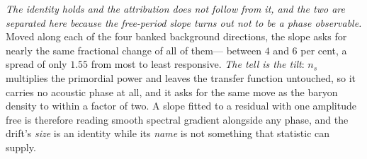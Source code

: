 \documentclass[11pt,a4paper]{article}
\theoremstyle{plain}
\theoremstyle{definition}
\theoremstyle{remark}
\begin{document}
\emph{The identity holds and the attribution does not follow from it, and the two are separated here
because the free-period slope turns out not to be a phase observable.} Moved along each of the four
banked background directions, the slope asks for nearly the same fractional change of all of them---
between $4$ and $6$ per cent, a spread of only $1.55$ from most to least responsive. \emph{The tell
is the tilt}: $n_{s}$ multiplies the primordial power and leaves the transfer function untouched, so
it carries no acoustic phase at all, and it asks for the same move as the baryon density to within a
factor of two. A slope fitted to a residual with one amplitude free is therefore reading smooth
spectral gradient alongside any phase, and the drift's \emph{size} is an identity while its
\emph{name} is not something that statistic can supply.
\end{document}
